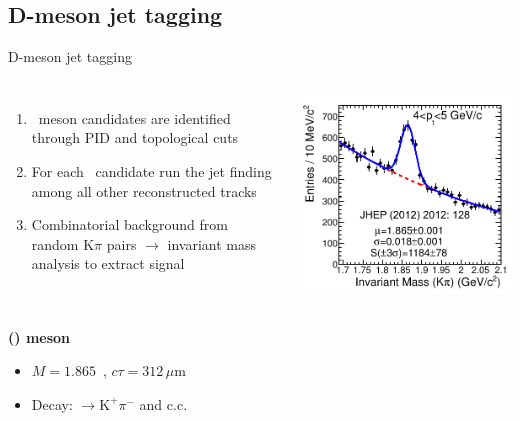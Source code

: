 \documentclass[xcolor={usenames,dvipsnames}]{beamer}
\begin{document}
\subsection{D-meson jet tagging}
\begin{frame}{D-meson jet tagging}

\begin{columns}

\begin{enumerate}
\item \Dzero\ meson candidates are identified through \alert{PID} and \alert{topological} cuts
\item For each \Dzero\ candidate run the \alert{jet finding} among all other reconstructed tracks
\item Combinatorial background from random $\mathrm{K}\pi$ pairs $\rightarrow$ \alert{invariant mass analysis} to extract signal
\end{enumerate}

\includegraphics[width=\textwidth]{img/ALICE_D0InvMass}
\end{columns}
\bigskip
\textbf{\alert{\Dzero(\Dzerobar) meson}}
\begin{itemize}
\item $M=1.865$~\GeVcsq, $c\tau=312\,\mu\mathrm{m}$ 
\item Decay: \Dzero$\rightarrow\mathrm{K}^+\pi^-$ and c.c.
\end{itemize}

\end{frame}
\end{document}
